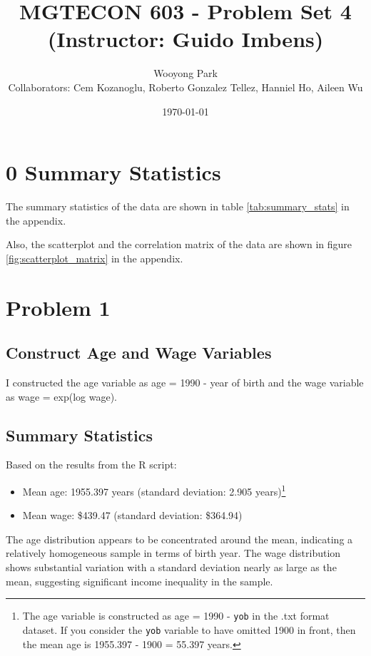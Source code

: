 \documentclass[12pt]{article}
\title{MGTECON 603 - Problem Set 4\\ \small{(Instructor: Guido Imbens)}}
\author{Wooyong Park\\ {\small Collaborators: Cem Kozanoglu, Roberto Gonzalez Tellez, Hanniel Ho, Aileen Wu}}
\date{\today}
\begin{document}
\maketitle

\section*{0 Summary Statistics}

The summary statistics of the data are shown in table \ref{tab:summary_stats} in the appendix.

Also, the scatterplot and the correlation matrix of the data are shown in figure \ref{fig:scatterplot_matrix} in the appendix.



\section{Problem 1}

\subsection{Construct Age and Wage Variables}

I constructed the age variable as age = 1990 - year of birth and the wage variable as wage = exp(log wage).

\subsection{Summary Statistics}

Based on the results from the R script:

\begin{itemize}
    \item Mean age: 1955.397 years (standard deviation: 2.905 years)\footnote{The age variable is constructed as age = 1990 - \texttt{yob} in the .txt format dataset. If you consider the \texttt{yob} variable to have omitted 1900 in front, then the mean age is 1955.397 - 1900 = 55.397 years.}
    \item Mean wage: \$439.47 (standard deviation: \$364.94)
\end{itemize}

The age distribution appears to be concentrated around the mean, indicating a relatively homogeneous sample in terms of birth year. The wage distribution shows substantial variation with a standard deviation nearly as large as the mean, suggesting significant income inequality in the sample.
\end{document}
